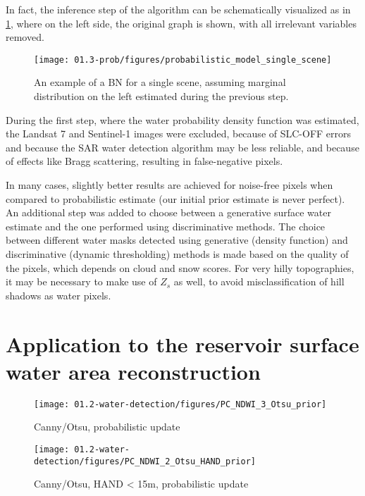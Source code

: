 In fact, the inference step of the algorithm can be schematically visualized as in \ref{fig:prob-diagram}, where on the left side, the original graph is shown, with all irrelevant variables removed. 

\begin{figure}[H]
	\centering
	\texttt{[image: 01.3-prob/figures/probabilistic\_model\_single\_scene]}
	\caption{An example of a BN for a single scene, assuming marginal distribution on the left estimated during the previous step.}
	\label{fig:prob-diagram}
\end{figure}

During the first step, where the water probability density function was estimated, the Landsat 7 and Sentinel-1 images were excluded, because of SLC-OFF errors and because the \gls{SAR} water detection algorithm may be less reliable, and because of effects like Bragg scattering, resulting in false-negative pixels.

In many cases, slightly better results are achieved for noise-free pixels when compared to probabilistic estimate (our initial prior estimate is never perfect). An additional step was added to choose between a generative surface water estimate and the one performed using discriminative methods. The choice between different water masks detected using generative (density function) and discriminative (dynamic thresholding) methods is made based on the quality of the pixels, which depends on cloud and snow scores. For very hilly topographies, it may be necessary to make use of $Z_s$ as well, to avoid misclassification of hill shadows as water pixels.

\section{Application to the reservoir surface water area reconstruction}

\begin{figure}
	\centering
	\texttt{[image: 01.2-water-detection/figures/PC\_NDWI\_3\_Otsu\_prior]}
	\caption{Canny/Otsu, probabilistic update}
	\label{fig:r1_canny_otsu_nb}
\end{figure}

\begin{figure}
	\centering
	\texttt{[image: 01.2-water-detection/figures/PC\_NDWI\_2\_Otsu\_HAND\_prior]}
	\caption{Canny/Otsu, HAND < 15m, probabilistic update}
	\label{fig:r1_canny_otsu_hand_nb}
\end{figure}

